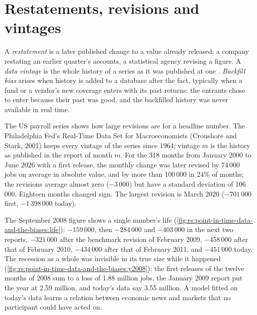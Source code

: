 \section{Restatements, revisions and vintages}

\begin{definition}\label{def:rs:point-in-time-data-and-the-biases:vintage}
A \emph{restatement} is a later published change to a value already released: a company restating an
earlier quarter's accounts, a statistical agency revising a figure. A \emph{data vintage} is the whole
history of a series as it was published at one . \emph{Backfill bias} arises when history is
added to a database after the fact, typically when a fund or a vendor's new coverage enters with its past returns: the entrants
chose to enter because their past was good, and the backfilled history was never available in real time.
\end{definition}

The US payroll series shows how large revisions are for a headline number. The Philadelphia Fed's Real-Time Data Set for
Macroeconomists (Croushore and Stark, 2001) keeps every vintage of the series since 1964; vintage $m$ is the history as
published in the report of month $m$. For the 318 months from January 2000 to June 2026 with a first release, the monthly
change was later revised by 74\,000 jobs on average in absolute value, and by more than 100\,000 in 24\% of months; the
revisions average almost zero ($-3\,000$) but have a standard deviation of 106\,000. Eighteen months changed sign. The largest
revision is March 2020 ($-701\,000$ first, $-1\,398\,000$ today).

The September 2008 figure shows a single number's life (\cref{fig:rs:point-in-time-data-and-the-biases:life}): $-159\,000$,
then $-284\,000$ and $-403\,000$ in the next two reports, $-321\,000$ after the benchmark revision of February 2009, $-458\,000$
after that of February 2010, $-434\,000$ after that of February 2011, and $-451\,000$ today. The recession as a whole was invisible in its true
size while it happened (\cref{fig:rs:point-in-time-data-and-the-biases:y2008}): the first releases of the twelve months of 2008
sum to a loss of 1.88 million jobs, the January 2009 report put the year at 2.59 million, and today's data say 3.55 million.
A model fitted on today's data learns a relation between economic news and markets that no participant could have acted on.

